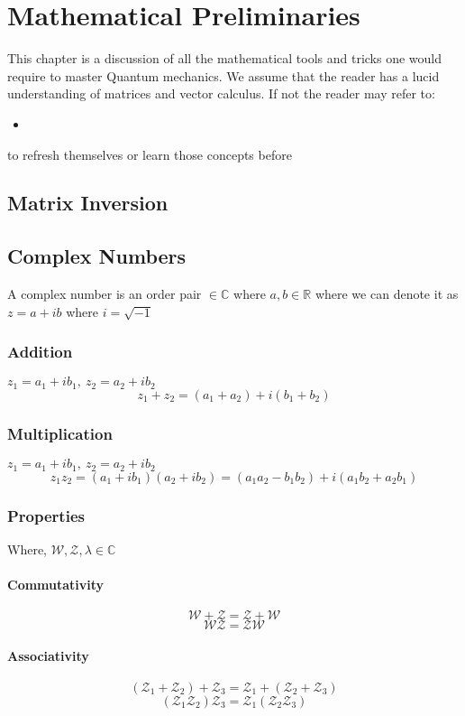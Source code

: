 \chapter{Mathematical Preliminaries}
This chapter is a discussion of all the mathematical tools and tricks one would require to master Quantum mechanics. We assume that the reader has a lucid understanding of matrices and vector calculus. If not the reader may refer to:
\begin{itemize}
	\item 
\end{itemize}
to refresh themselves or learn those concepts before 
\section{Matrix Inversion}
\section{Complex Numbers}
A complex number is an order pair ${} \in \mathbb{C}$ where $a,b \in \mathbb{R}$ where we can denote it as $z = a + ib$ where $i = \sqrt{-1}$
\subsection{Addition}
$z_{1} = a_{1} + ib_{1}, \ z_{2} = a_{2} + ib_{2}$
$$z_{1} + z_{2} =  (a_{1} + a_{2}) + i(b_{1} + b_{2})$$
\subsection{Multiplication}
$z_{1} = a_{1} + ib_{1}, \ z_{2} = a_{2} + ib_{2}$
$$z_{1}z_{2} =  (a_{1} + ib_{1})(a_{2} + ib_{2}) = (a_{1}a_{2} - b_{1}b_{2}) + i(a_{1}b_{2} + a_{2}b_{1})$$
\subsection{Properties}
Where, $\mathcal{W}, \mathcal{Z}, \lambda \in \mathbb{C}$
\subsubsection{Commutativity}
$$\mathcal{W} + \mathcal{Z} = \mathcal{Z} + \mathcal{W}$$
$$\mathcal{W}\mathcal{Z} = \mathcal{Z}\mathcal{W}$$
\subsubsection{Associativity}
$$(\mathcal{Z}_1 + \mathcal{Z}_2) + \mathcal{Z}_3 = \mathcal{Z}_1 + (\mathcal{Z}_2 + \mathcal{Z}_3)$$
$$(\mathcal{Z}_1\mathcal{Z}_2)\mathcal{Z}_3 = \mathcal{Z}_1(\mathcal{Z}_2\mathcal{Z}_3)$$
